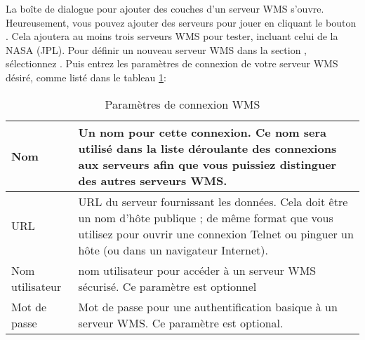 La boîte de dialogue  pour ajouter des couches d'un serveur WMS s'ouvre. Heureusement, vous pouvez ajouter des serveurs pour jouer en cliquant le bouton . Cela ajoutera au moins trois serveurs WMS pour tester, incluant celui de la NASA (JPL). Pour définir un nouveau serveur WMS dans la section , sélectionnez . Puis entrez les paramètres de connexion de votre serveur WMS désiré, comme listé dans le tableau \ref{tab:wms_connection_parms}:

\begin{table}[ht]
\centering
 \begin{tabular}{|l|p{11cm}|}
\hline Nom & Un nom pour cette connexion. Ce nom sera utilisé dans la liste déroulante des connexions aux serveurs afin que vous puissiez distinguer
des autres serveurs WMS. \\
\hline URL \index{WMS!URL} & URL du serveur fournissant les données. Cela doit
être un nom d'hôte publique ; de même format que vous utilisez pour ouvrir une
connexion Telnet ou pinguer un hôte (ou dans un navigateur Internet). \\
\hline Nom utilisateur \index{WMS!authentification} & nom utilisateur pour accéder
à un serveur WMS sécurisé. Ce paramètre est optionnel \\
\hline Mot de passe & Mot de passe pour une authentification basique à un serveur 
WMS. Ce paramètre est optional.\\
\hline
\end{tabular}
\caption{Paramètres de connexion WMS}\label{tab:wms_connection_parms}
\end{table}

